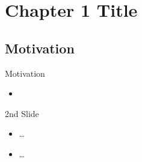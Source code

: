 
\section{Chapter 1 Title}
\label{chapter1}

\subsection{Motivation}
\begin{frame}{Motivation}
	\begin{itemize}
		\item \cite{Abbring2007}
	\end{itemize}
\end{frame}

\begin{frame}{2nd Slide}
	\begin{itemize}
		\item \ldots \pause
		\item \ldots
	\end{itemize}
	\vfill
	\hyperlink{backup_1}{}
\end{frame}
